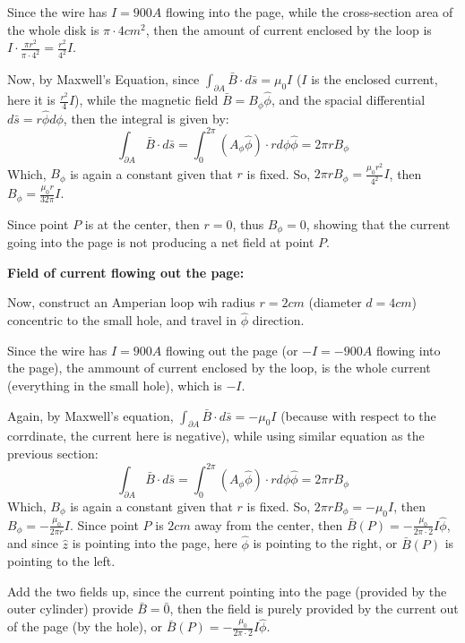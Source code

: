 \documentclass{article}
\begin{document}
Since the wire has $I=900A$ flowing into the page, while the cross-section area of the whole disk is $\pi\cdot 4 cm^2$, then the amount of current enclosed by
the loop is $I\cdot \frac{\pi r^2}{\pi \cdot 4^2} = \frac{r^2}{4^2}I$.

Now, by Maxwell's Equation, since $\int_{\partial A}\bar{B}\cdot d\bar{s}=\mu_0 I$ ($I$ is the enclosed current, here it is $\frac{r^2}{4}I$), while the magnetic field $\bar{B}=B_\phi\hat{\phi}$, and the spacial differential $d\bar{s}=r\hat{\phi}d\phi$,
then the integral is given by:
$$\int_{\partial A}\bar{B}\cdot d\bar{s}=\int_{0}^{2\pi}(A_\phi\hat{\phi})\cdot rd\phi \hat{\phi} = 2\pi r B_\phi$$
Which, $B_\phi$ is again a constant given that $r$ is fixed. So, $2\pi rB_\phi = \frac{\mu_0r^2}{4^2}I$, then $B_\phi = \frac{\mu_0r}{32\pi}I$.

Since point $P$ is at the center, then $r=0$, thus $B_\phi = 0$, showing that the current going into the page is not producing a net field at point $P$.

\hfill

\textbf{Field of current flowing out the page:}

Now, construct an Amperian loop wih radius $r= 2cm$ (diameter $d= 4 cm$) concentric to the small hole, and travel in $\hat{\phi}$ direction.

Since the wire has $I=900A$ flowing out the page (or $-I=-900A$ flowing into the page), the ammount of current enclosed by the loop,
is the whole current (everything in the small hole), which is $-I$.

Again, by Maxwell's equation, $\int_{\partial A}\bar{B}\cdot d\bar{s}=-\mu_0 I$ (because with respect to the corrdinate, the current here is negative), while using similar equation as the previous section:
$$\int_{\partial A}\bar{B}\cdot d\bar{s}=\int_{0}^{2\pi}(A_\phi\hat{\phi})\cdot rd\phi \hat{\phi} = 2\pi r B_\phi$$
Which, $B_\phi$ is again a constant given that $r$ is fixed. So, $2\pi rB_\phi = -\mu_0I$, then $B_\phi = -\frac{\mu_0}{2\pi r}I$.
Since point $P$ is $2cm$ away from the center, then $\bar{B}(P)=-\frac{\mu_0}{2\pi \cdot 2}I\hat{\phi}$, and since $\hat{z}$ is pointing into the page,
here $\hat{\phi}$ is pointing to the right, or $\bar{B}(P)$ is pointing to the left.

\hfill

Add the two fields up, since the current pointing into the page (provided by the outer cylinder) provide $\bar{B}=\bar{0}$, then the field is purely provided by the current out of the page (by the hole), or $\bar{B}(P)=-\frac{\mu_0}{2\pi \cdot 2}I\hat{\phi}$.
\end{document}
